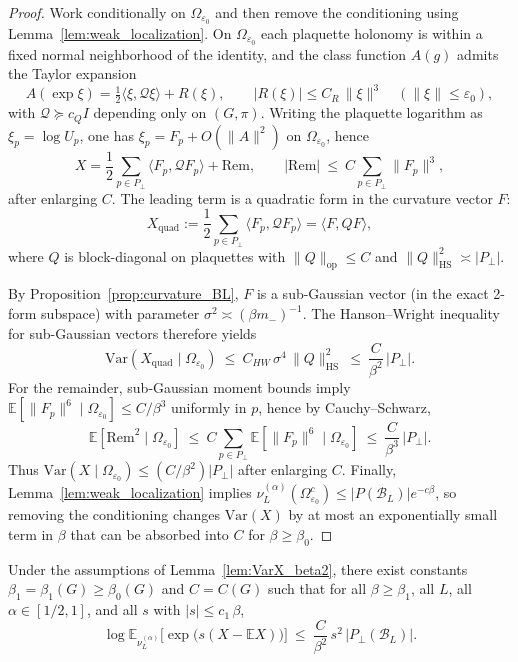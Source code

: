 \begin{proof}
Work conditionally on $\Omega_{\varepsilon_0}$ and then remove the conditioning using Lemma~\ref{lem:weak_localization}.
On $\Omega_{\varepsilon_0}$ each plaquette holonomy is within a fixed normal neighborhood of the identity, and the class function
$A(g)$ admits the Taylor expansion
\begin{equation}\label{eq:A_Taylor}
A(\exp \xi)=\tfrac12\langle \xi,\mathcal Q \xi\rangle + R(\xi),
\qquad |R(\xi)|\le C_R\,\|\xi\|^3
\quad (\|\xi\|\le \varepsilon_0),
\end{equation}
with $\mathcal Q\succeq c_Q I$ depending only on $(G,\pi)$.
Writing the plaquette logarithm as $\xi_p=\log U_p$, one has $\xi_p=F_p+O(\|A\|^2)$ on $\Omega_{\varepsilon_0}$, hence
\[
X
=\frac12\sum_{p\in P_\perp}\langle F_p,\mathcal Q F_p\rangle
+ \mathrm{Rem},
\qquad
|\mathrm{Rem}|\ \le\ C\sum_{p\in P_\perp}\|F_p\|^3,
\]
after enlarging $C$.
The leading term is a quadratic form in the curvature vector $F$:
\[
X_{\mathrm{quad}}:=\frac12\sum_{p\in P_\perp}\langle F_p,\mathcal Q F_p\rangle
=\langle F, Q F\rangle,
\]
where $Q$ is block-diagonal on plaquettes with $\|Q\|_{\mathrm{op}}\le C$ and
$\|Q\|_{\mathrm{HS}}^2\asymp |P_\perp|$.

By Proposition~\ref{prop:curvature_BL}, $F$ is a sub-Gaussian vector (in the exact 2-form subspace) with parameter
$\sigma^2\asymp (\beta m_-)^{-1}$.
The Hanson--Wright inequality for sub-Gaussian vectors therefore yields
\[
\mathrm{Var}(X_{\mathrm{quad}}\mid \Omega_{\varepsilon_0})
\ \le\ C_{HW}\,\sigma^4\,\|Q\|_{\mathrm{HS}}^2
\ \le\ \frac{C}{\beta^2}\,|P_\perp|.
\]
For the remainder, sub-Gaussian moment bounds imply
$\mathbb E[\|F_p\|^6\mid\Omega_{\varepsilon_0}] \le C/\beta^3$ uniformly in $p$,
hence by Cauchy--Schwarz,
\[
\mathbb E[\mathrm{Rem}^2\mid\Omega_{\varepsilon_0}]
\ \le\ C\sum_{p\in P_\perp}\mathbb E[\|F_p\|^6\mid\Omega_{\varepsilon_0}]
\ \le\ \frac{C}{\beta^3}\,|P_\perp|.
\]
Thus $\mathrm{Var}(X\mid\Omega_{\varepsilon_0})\le (C/\beta^2)|P_\perp|$ after enlarging $C$.
Finally, Lemma~\ref{lem:weak_localization} implies $\nu_L^{(\alpha)}(\Omega_{\varepsilon_0}^c)\le |P(\mathcal B_L)|e^{-c\beta}$,
so removing the conditioning changes $\mathrm{Var}(X)$ by at most an exponentially small term in $\beta$ that can be absorbed into $C$ for
$\beta\ge\beta_0$.
\end{proof}

\begin{lemma}\label{lem:mgf_centered_X}
Under the assumptions of Lemma~\ref{lem:VarX_beta2}, there exist constants $\beta_1=\beta_1(G)\ge\beta_0(G)$ and $C=C(G)$ such that for all
$\beta\ge\beta_1$, all $L$, all $\alpha\in[1/2,1]$, and all $s$ with $|s|\le c_1\,\beta$,
\begin{equation}\label{eq:mgf_centered_X}
\log \mathbb E_{\nu_L^{(\alpha)}}\!\Big[\exp\big(s(X-\mathbb E X)\big)\Big]
\ \le\ \frac{C}{\beta^2}\,s^2\,|P_\perp(\mathcal B_L)|.
\end{equation}
\end{lemma}

